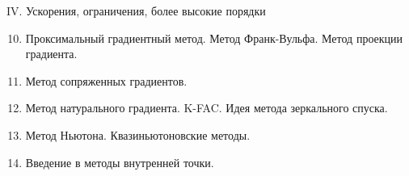 \documentclass[9pt, aspectratio=169]{beamer}
\begin{document}
\begin{frame}{IV. Ускорения, ограничения, более высокие порядки}
    \begin{minipage}{0.618\textwidth}
        \begin{enumerate}
            \setcounter{enumi}{9}
            \item Проксимальный градиентный метод. Метод Франк-Вульфа. Метод проекции градиента. 
            \item Метод сопряженных градиентов.
            \item Метод натурального градиента. K-FAC. Идея метода зеркального спуска. 
            \item Метод Ньютона. Квазиньютоновские методы.
            \item Введение в методы внутренней точки.
        \end{enumerate}
      \end{minipage}%
      \begin{minipage}{0.382\textwidth}
      \end{minipage}
\end{frame}
\end{document}
